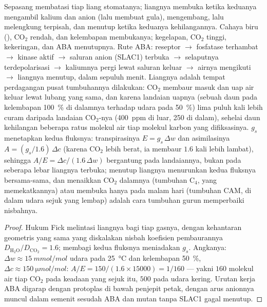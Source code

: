 \begin{proposition}\label{prop:b3:plant-molecular-physiology:stomata}
%
Sepasang \emph{} membatasi tiap liang stomatanya; liangnya membuka
ketika keduanya mengambil kalium dan anion (lalu membuat gula), mengembang, lalu
melengkung terpisah, dan menutup ketika keduanya kehilangannya. Cahaya biru (),
CO$_{2}$ rendah, dan kelembapan membukanya; kegelapan, CO$_{2}$ tinggi, kekeringan, dan
ABA menutupnya. Rute ABA: reseptor $\to$ fosfatase terhambat $\to$
kinase aktif $\to$ saluran anion (SLAC1) terbuka $\to$ selaputnya
terdepolarisasi $\to$ kaliumnya pergi lewat saluran keluar $\to$ airnya
mengikuti $\to$ liangnya menutup, dalam sepuluh menit. Liangnya adalah tempat
perdagangan pusat tumbuhannya dilakukan: CO$_{2}$ membaur masuk dan uap air
keluar lewat lubang yang sama, dan karena landaian uapnya (sebuah daun pada
kelembapan \qty{100}{\%} di dalamnya terhadap udara pada \qty{50}{\%}) lima puluh
kali lebih curam daripada landaian CO$_{2}$-nya (\qty{400}{ppm} di luar,
\qty{250}{} di dalam), sehelai daun kehilangan beberapa ratus molekul air
tiap molekul karbon yang difiksasinya. \emph{}
$g_{s}$ menetapkan kedua fluksnya: transpirasinya $E = g_{s}\,\Delta w$ dan
asimilasinya $A = (g_{s}/1.6)\,\Delta c$ (karena CO$_{2}$ lebih berat, ia
membaur $1.6$ kali lebih lambat), sehingga \emph{}
$A/E = \Delta c/(1.6\,\Delta w)$ bergantung pada landaiannya, bukan pada seberapa
lebar liangnya terbuka; menutup liangnya menurunkan kedua fluksnya bersama-sama, dan
menaikkan CO$_{2}$ dalamnya (tumbuhan C$_{4}$, yang memekatkannya) atau
membuka hanya pada malam hari (tumbuhan CAM, di dalam udara sejuk yang lembap) adalah cara tumbuhan
gurun memperbaiki nisbahnya.
\end{proposition}
\begin{proof}
Hukum Fick melintasi liangnya bagi tiap gasnya, dengan kehantaran geometris yang sama
yang diskalakan nisbah koefisien pembaurannya
$D_{\mathrm{H_2O}}/D_{\mathrm{CO_2}} = 1.6$; membagi kedua fluksnya
meniadakan $g_{s}$. Angkanya: $\Delta w \approx \qty{15}{mmol/mol}$ udara
pada \qty{25}{\celsius} dan kelembapan \qty{50}{\%}, $\Delta c \approx
\qty{150}{\micro mol/mol}$: $A/E = 150/(1.6\times\num{15000}) = 1/160$
--- yakni $160$ molekul air tiap CO$_{2}$ pada keadaan yang sejuk itu,
$500$ pada udara kering. Urutan kerja ABA digarap dengan
protoplas  di bawah penjepit petak, dengan arus anionnya muncul
dalam semenit sesudah ABA dan mutan tanpa SLAC1 gagal menutup.
\end{proof}

